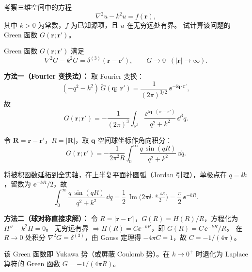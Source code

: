 \begin{question}[修正Helmholtz方程的Green函数]

考察三维空间中的方程
\[
\nabla^{2} u - k^{2} u = f(\bm{r}),
\]
其中 $k > 0$ 为常数，$f$ 为已知源项，且 $u$ 在无穷远处有界。
试计算该问题的 Green 函数 $G(\bm{r};\bm{r}')$。

\begin{solution}

Green 函数 $G(\bm{r};\bm{r}')$ 满足
\[
\nabla^{2} G - k^{2} G = \delta^{(3)}(\bm{r} - \bm{r}'),
\qquad G \to 0\;\;(|\bm{r}|\to\infty).
\]

\textbf{方法一（Fourier 变换法）：}
取 Fourier 变换：
\[
(-q^{2} - k^{2})\,\tilde{G}(\bm{q};\,\bm{r}')
= \frac{1}{(2\pi)^{3/2}}\,\ee^{-\ii\bm{q}\cdot\bm{r}'},
\]
故
\[
G(\bm{r};\bm{r}') = -\frac{1}{(2\pi)^{3}}
\int_{\mathbb{R}^{3}} \frac{\ee^{\ii\bm{q}\cdot(\bm{r}-\bm{r}')}}{q^{2} + k^{2}}\,\dd^{3}q.
\]

令 $\bm{R} = \bm{r} - \bm{r}'$，$R = |\bm{R}|$，取 $\bm{q}$ 空间球坐标作角向积分：
\[
G(\bm{r};\bm{r}')
= -\frac{1}{2\pi^{2}R}
\int_{0}^{\infty} \frac{q\,\sin(qR)}{q^{2}+k^{2}}\,\dd q.
\]

将被积函数延拓到全实轴，在上半复平面补圆弧（Jordan 引理），单极点在 $q=\ii k$，留数为 $\ee^{-kR}/2$，故
\[
\int_{0}^{\infty} \frac{q\,\sin(qR)}{q^{2}+k^{2}}\,\dd q
= \frac{1}{2}\,\operatorname{Im}\!\bigl(2\pi\ii\cdot \tfrac{\ee^{-kR}}{2}\bigr)
= \frac{\pi}{2}\,\ee^{-kR}.
\]

\textbf{方法二（球对称直接求解）：}
令 $R = |\bm{r} - \bm{r}'|$，$G(R)=H(R)/R$，方程化为 $H'' - k^{2}H = 0$。
无穷远有界 $\Rightarrow H(R) = C\ee^{-kR}$，即 $G(R) = C\,\ee^{-kR}/R$。
在 $R\to0$ 处积分 $\nabla^{2}G = \delta^{(3)}$，由 Gauss 定理得 $-4\pi C = 1$，故 $C = -1/(4\pi)$。


该 Green 函数即 Yukawa 势（或屏蔽 Coulomb 势）。在 $k\to0^{+}$ 时退化为
Laplace 算符的 Green 函数 $G = -1/(4\pi R)$。

\end{solution}
\end{question}

\clearpage

